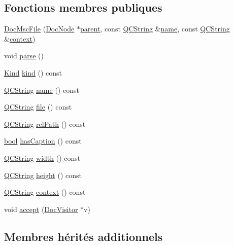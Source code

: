 \subsection*{Fonctions membres publiques}
\begin{DoxyCompactItemize}
\item 
\hyperlink{class_doc_msc_file_a0a89ab57d101a38da934fe2372ff40e8}{Doc\+Msc\+File} (\hyperlink{class_doc_node}{Doc\+Node} $\ast$\hyperlink{class_doc_node_a990d8b983962776a647e6231d38bd329}{parent}, const \hyperlink{class_q_c_string}{Q\+C\+String} \&\hyperlink{class_doc_msc_file_a624798bf7254e57ecfc5f60f2e57b680}{name}, const \hyperlink{class_q_c_string}{Q\+C\+String} \&\hyperlink{class_doc_msc_file_acd9843033dd0cdc3a0e129645108fa69}{context})
\item 
void \hyperlink{class_doc_msc_file_af75b42178732dcddf90d1a8b4612d3d9}{parse} ()
\item 
\hyperlink{class_doc_node_aebd16e89ca590d84cbd40543ea5faadb}{Kind} \hyperlink{class_doc_msc_file_a660203067a59a6dbe35453479bff1947}{kind} () const 
\item 
\hyperlink{class_q_c_string}{Q\+C\+String} \hyperlink{class_doc_msc_file_a624798bf7254e57ecfc5f60f2e57b680}{name} () const 
\item 
\hyperlink{class_q_c_string}{Q\+C\+String} \hyperlink{class_doc_msc_file_ae8b2c310f6c4659dd0a647bb72e88e71}{file} () const 
\item 
\hyperlink{class_q_c_string}{Q\+C\+String} \hyperlink{class_doc_msc_file_a169c410a794d388c6b933b5d5bc7583c}{rel\+Path} () const 
\item 
\hyperlink{qglobal_8h_a1062901a7428fdd9c7f180f5e01ea056}{bool} \hyperlink{class_doc_msc_file_a5f437ff76e39b48283de1aef4ef7dad6}{has\+Caption} () const 
\item 
\hyperlink{class_q_c_string}{Q\+C\+String} \hyperlink{class_doc_msc_file_aa5e2451c2e8576b149149db04b653bc5}{width} () const 
\item 
\hyperlink{class_q_c_string}{Q\+C\+String} \hyperlink{class_doc_msc_file_a639809349424946ba6cbb041f41b4905}{height} () const 
\item 
\hyperlink{class_q_c_string}{Q\+C\+String} \hyperlink{class_doc_msc_file_acd9843033dd0cdc3a0e129645108fa69}{context} () const 
\item 
void \hyperlink{class_doc_msc_file_aeb1ca7bcae9714c6cd1c71c1665a1dd1}{accept} (\hyperlink{class_doc_visitor}{Doc\+Visitor} $\ast$v)
\end{DoxyCompactItemize}
\subsection*{Membres hérités additionnels}


